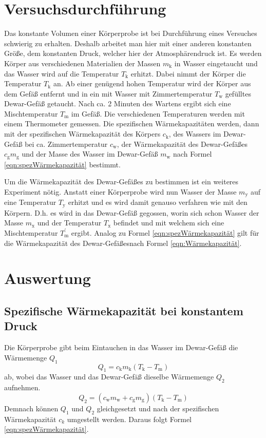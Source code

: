 \documentclass[titlepage = firstcover]{scrartcl}
\begin{document}
    \section{Versuchsdurchführung}
        Das konstante Volumen einer Körperprobe ist bei Durchführung eines Versuches schwierig zu erhalten.
        Deshalb arbeitet man hier mit einer anderen konstanten Größe, dem konstanten Druck, welcher hier
        der Atmosphärendruck ist. Es werden Körper aus verschiedenen Materialien der Massen $m_\text{k}$ in Wasser
        eingetaucht und das Wasser wird auf die Temperatur $T_\text{k}$ erhitzt. Dabei nimmt der Körper die Temperatur $T_\text{k}$ an. Ab einer genügend hohen Temperatur
        wird der Körper aus dem Gefäß entfernt und in ein mit Wasser mit Zimmertemperatur $T_\text{w}$ gefülltes
        Dewar-Gefäß getaucht. Nach ca. 2 Minuten des Wartens ergibt sich eine Mischtemperatur $T_\text{m}$ im Gefäß.
        Die verschiedenen Temperaturen werden mit einem Thermometer gemessen.
        Die spezifischen Wärmekapazitäten werden, dann mit der spezifischen Wärmekapazität des Körpers $c_\text{k}$, des Wassers im Dewar-Gefäß bei ca. Zimmertemperatur
        $c_\text{w}$, der Wärmekapazität des Dewar-Gefäßes $c_\text{g}m_\text{g}$ und der Masse des Wasser im Dewar-Gefäß
        $m_\text{w}$ nach Formel \eqref{eqn:spezWärmekapazität} bestimmt.

        Um die Wärmekapazität des Dewar-Gefäßes zu bestimmen ist ein weiteres Experiment nötig. Anstatt einer Körperprobe
        wird nun Wasser der Masse $m_\text{y}$ auf eine Temperatur $T_\text{y}$ erhitzt und es wird damit genauso verfahren wie mit den Körpern.
        D.h. es wird in das Dewar-Gefäß gegossen, worin sich schon Wasser der Masse $m_\text{x}$ und der Temperatur
        $T_\text{x}$ befindet und mit welchem sich eine Mischtemperatur $T_\text{m}^{'}$ ergibt. Analog zu Formel
        \eqref{eqn:spezWärmekapazität} gilt für die Wärmekapazität des Dewar-Gefäßesnach Formel \eqref{eqn:Wärmekapazität}.
    

    \section{Auswertung}
        \subsection{Spezifische Wärmekapazität bei konstantem Druck}
            Die Körperprobe gibt beim Eintauchen in das Wasser im Dewar-Gefäß die Wärmemenge $Q_1$
            \begin{equation*}
                Q_1 = c_\text{k}m_\text{k}(T_\text{k} - T_\text{m})
            \end{equation*}
            ab, wobei das Wasser und das Dewar-Gefäß dieselbe Wärmemenge $Q_2$ aufnehmen.
            \begin{equation*}
                Q_2 = (c_\text{w}m_\text{w} + c_\text{g}m_\text{g})(T_\text{k} - T_\text{m})
            \end{equation*}
            Demnach können $Q_1$ und $Q_2$ gleichgesetzt und nach der spezifischen Wärmekapazität $c_k$ umgestellt werden. Daraus folgt Formel \eqref{eqn:spezWärmekapazität}.
            
\end{document}
